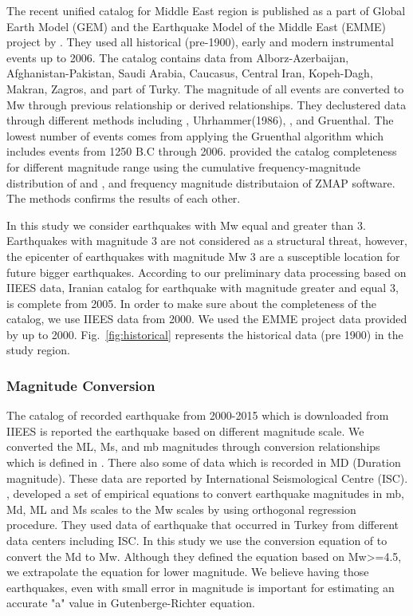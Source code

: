 The recent unified catalog for Middle East region is published as a part of Global Earth Model (GEM) and the Earthquake Model of the Middle East (EMME) project by \citet{Zare2014}. They used all historical (pre-1900), early and modern instrumental events up to 2006. The catalog contains data from Alborz-Azerbaijan, Afghanistan-Pakistan, Saudi Arabia, Caucasus, Central Iran, Kopeh-Dagh, Makran, Zagros, and part of Turky. The magnitude of all events are converted to Mw through previous relationship or derived relationships. They declustered data through different methods including \citet{Gardner1974}, Uhrhammer(1986), \citet{Reasenberg1985}, and Gruenthal. The lowest number of events comes from applying the Gruenthal algorithm which includes events from 1250 B.C through 2006. \citet{Zare2014} provided the catalog completeness for different magnitude range using  the cumulative frequency-magnitude distribution of  \citet{Gutenberg1944} and \citet{richter1958}, and frequency magnitude distributaion of ZMAP \citep{Wiemer2001} software. The methods confirms the results of each other. 

In this study we consider earthquakes with Mw equal and greater than 3. Earthquakes with magnitude 3 are not considered as a structural threat, however, the epicenter of earthquakes with magnitude Mw 3 are a  susceptible location for future bigger earthquakes.  According to our preliminary data processing based on IIEES data, Iranian catalog for earthquake with magnitude greater and equal 3, is complete from 2005. In order to make sure about the completeness of the catalog, we use IIEES data from 2000. We used the EMME project data provided by \citet{Zare2014} up to 2000. Fig.~\ref{fig:historical} represents the historical data (pre 1900) in the study region. 

\subsubsection{Magnitude Conversion}

The catalog of recorded earthquake from 2000-2015 which is downloaded from IIEES is reported the earthquake based on different magnitude scale. We converted the ML, Ms, and mb magnitudes through conversion relationships which is defined in \citet{Zare2014}. There also some of data which is recorded in MD (Duration magnitude). These data are reported by International Seismological Centre (ISC).  \citet{Deniz2010}, developed a set of empirical equations to convert earthquake magnitudes in mb, Md, ML and Ms scales to the Mw scales by using orthogonal regression procedure. They used data of earthquake that occurred in Turkey from different data centers including ISC. In this study we use the conversion equation of \citet{Deniz2010} to convert the Md to Mw. Although they defined the equation based on Mw>=4.5, we extrapolate the equation for lower magnitude. We believe having those earthquakes, even with small error  in magnitude is important for estimating an accurate "a" value  in Gutenberge-Richter equation.


